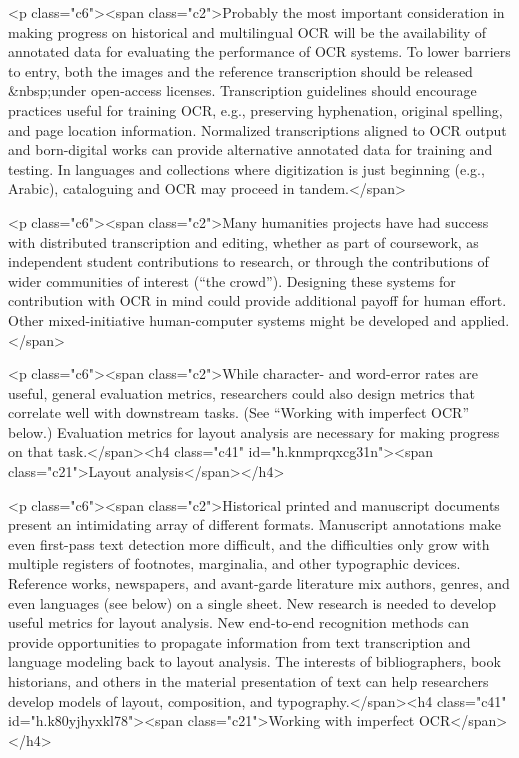 \documentclass[twoside,11pt]{report}
\begin{document}
<p class="c6"><span class="c2">Probably the most important consideration in making progress on historical and multilingual OCR will be the availability of annotated data for evaluating the performance of OCR systems. To lower barriers to entry, both the images and the reference transcription should be released &nbsp;under open-access licenses. Transcription guidelines should encourage practices useful for training OCR, e.g., preserving hyphenation, original spelling, and page location information. Normalized transcriptions aligned to OCR output and born-digital works can provide alternative annotated data for training and testing. In languages and collections where digitization is just beginning (e.g., Arabic), cataloguing and OCR may proceed in tandem.</span>

<p class="c6"><span class="c2">Many humanities projects have had success with distributed transcription and editing, whether as part of coursework, as independent student contributions to research, or through the contributions of wider communities of interest (``the crowd''). Designing these systems for contribution with OCR in mind could provide additional payoff for human effort. Other mixed-initiative human-computer systems might be developed and applied.</span>

<p class="c6"><span class="c2">While character- and word-error rates are useful, general evaluation metrics, researchers could also design metrics that correlate well with downstream tasks. (See ``Working with imperfect OCR'' below.) Evaluation metrics for layout analysis are necessary for making progress on that task.</span><h4 class="c41" id="h.knmprqxcg31n"><span class="c21">Layout analysis</span></h4>

<p class="c6"><span class="c2">Historical printed and manuscript documents present an intimidating array of different formats. Manuscript annotations make even first-pass text detection more difficult, and the difficulties only grow with multiple registers of footnotes, marginalia, and other typographic devices. Reference works, newspapers, and avant-garde literature mix authors, genres, and even languages (see below) on a single sheet. New research is needed to develop useful metrics for layout analysis. New end-to-end recognition methods can provide opportunities to propagate information from text transcription and language modeling back to layout analysis. The interests of bibliographers, book historians, and others in the material presentation of text can help researchers develop models of layout, composition, and typography.</span><h4 class="c41" id="h.k80yjhyxkl78"><span class="c21">Working with imperfect OCR</span></h4>
\end{document}

